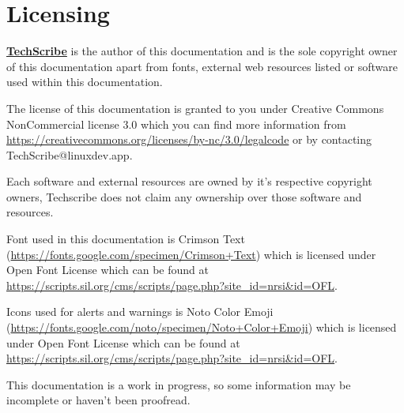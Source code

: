  \section*{Licensing}
 
\href{https://disabled.social/@TechScribe}{\textbf{TechScribe}} is the author of this documentation and is the sole copyright owner of this documentation apart from fonts, external web resources listed or software used within this documentation. 

The license of this documentation is granted to you under Creative Commons NonCommercial license 3.0 which you can find more information from \href{https://creativecommons.org/licenses/by-nc/3.0/legalcode}{https://creativecommons.org/licenses/by-nc/3.0/legalcode} or by contacting TechScribe@linuxdev.app.

Each software and external resources are owned by it's respective copyright owners, Techscribe does not claim any ownership over those software and resources.

Font used in this documentation is Crimson Text (\href{https://fonts.google.com/specimen/Crimson+Text}{https://fonts.google.com/specimen/Crimson+Text}) which is licensed under Open Font License which can be found at \href{https://scripts.sil.org/cms/scripts/page.php?site_id=nrsi&id=OFL}{https://scripts.sil.org/cms/scripts/page.php?site\_id=nrsi\&id=OFL}.

Icons used for alerts and warnings is Noto Color Emoji (\href{https://fonts.google.com/noto/specimen/Noto+Color+Emoji}{https://fonts.google.com/noto/specimen/Noto+Color+Emoji}) which is licensed under Open Font License which can be found at \href{https://scripts.sil.org/cms/scripts/page.php?site_id=nrsi&id=OFL}{https://scripts.sil.org/cms/scripts/page.php?site\_id=nrsi\&id=OFL}.

This documentation is a work in progress, so some information may be incomplete or haven't been proofread.